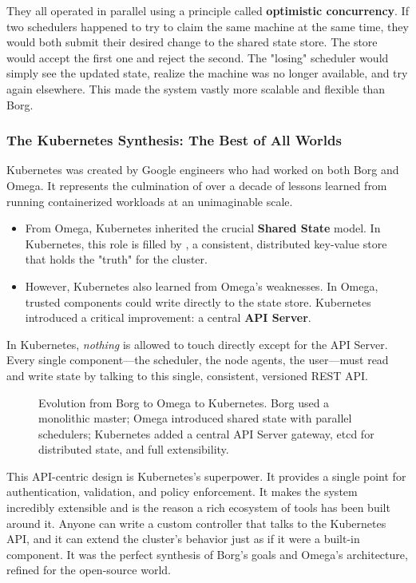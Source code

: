 They all operated in parallel using a principle called \textbf{optimistic concurrency}. If two schedulers happened to try to claim the same machine at the same time, they would both submit their desired change to the shared state store. The store would accept the first one and reject the second. The "losing" scheduler would simply see the updated state, realize the machine was no longer available, and try again elsewhere. This made the system vastly more scalable and flexible than Borg.

\subsubsection{\textbf{The Kubernetes Synthesis: The Best of All Worlds}}


Kubernetes was created by Google engineers who had worked on both Borg and Omega. It represents the culmination of over a decade of lessons learned from running containerized workloads at an unimaginable scale.

\begin{itemize}
\item From Omega, Kubernetes inherited the crucial \textbf{Shared State} model. In Kubernetes, this role is filled by , a consistent, distributed key-value store that holds the "truth" for the cluster.
\item However, Kubernetes also learned from Omega's weaknesses. In Omega, trusted components could write directly to the state store. Kubernetes introduced a critical improvement: a central \textbf{API Server}.
\end{itemize}

In Kubernetes, \textit{nothing} is allowed to touch  directly except for the API Server. Every single component---the scheduler, the node agents, the user---must read and write state by talking to this single, consistent, versioned REST API.

\begin{figure}[htbp]
\centering

\caption{Evolution from Borg to Omega to Kubernetes. Borg used a monolithic master; Omega introduced shared state with parallel schedulers; Kubernetes added a central API Server gateway, etcd for distributed state, and full extensibility.}
\label{fig:4_3}
\end{figure}


This API-centric design is Kubernetes's superpower. It provides a single point for authentication, validation, and policy enforcement. It makes the system incredibly extensible and is the reason a rich ecosystem of tools has been built around it. Anyone can write a custom controller that talks to the Kubernetes API, and it can extend the cluster's behavior just as if it were a built-in component. It was the perfect synthesis of Borg's goals and Omega's architecture, refined for the open-source world.
